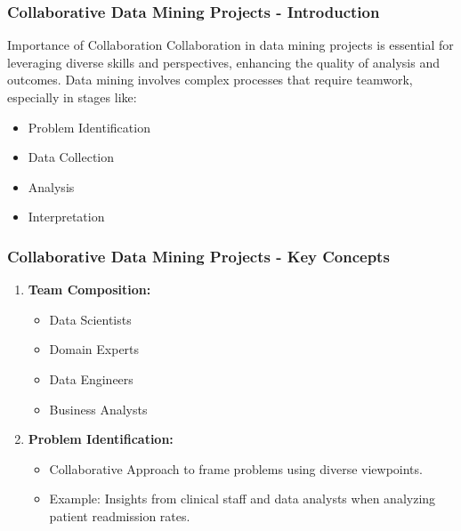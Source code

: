 \documentclass[aspectratio=169]{beamer}
\begin{document}
\begin{frame}[fragile]
    \frametitle{Collaborative Data Mining Projects - Introduction}
    \begin{block}{Importance of Collaboration}
        Collaboration in data mining projects is essential for leveraging diverse skills and perspectives, enhancing the quality of analysis and outcomes. Data mining involves complex processes that require teamwork, especially in stages like:
    \end{block}
    \begin{itemize}
        \item Problem Identification
        \item Data Collection
        \item Analysis
        \item Interpretation
    \end{itemize}
\end{frame}

\begin{frame}[fragile]
    \frametitle{Collaborative Data Mining Projects - Key Concepts}
    \begin{enumerate}
        \item \textbf{Team Composition:}
        \begin{itemize}
            \item Data Scientists
            \item Domain Experts
            \item Data Engineers
            \item Business Analysts
        \end{itemize}
        
        \item \textbf{Problem Identification:}
        \begin{itemize}
            \item Collaborative Approach to frame problems using diverse viewpoints.
            \item Example: Insights from clinical staff and data analysts when analyzing patient readmission rates.
        \end{itemize}
    \end{enumerate}
\end{frame}
\end{document}
